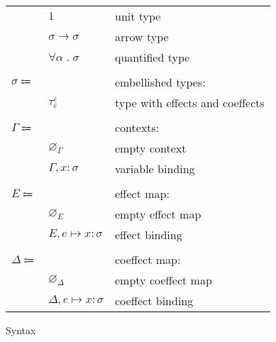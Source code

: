 \documentclass[12pt]{article}
\newcommand\anno[2]{#1 : #2}
\newcommand\evar{x}
\newcommand\proper{\tau}
\newcommand\embellished{\sigma}
\newcommand\tvar{\alpha}
\newcommand\tembellished[3]{{#1}^{#2}_{#3}}
\newcommand\tunit{1}
\newcommand\tarrow[2]{#1 \rightarrow #2}
\newcommand\tforall[2]{\forall #1 \; . \; #2}
\newcommand\context{\Gamma}
\newcommand\cempty{\varnothing_{\context}}
\newcommand\cextend[2]{#1, #2}
\newcommand\row{\varepsilon}
\newcommand\effect{e}
\newcommand\effectmap{E}
\newcommand\coeffectmap{\Delta}
\newcommand\emempty{\varnothing_{\effectmap}}
\newcommand\ecomempty{\varnothing_{\coeffectmap}}
\newcommand\emmap[2]{#1 \mapsto #2}
\newcommand\emextend[2]{#1, #2}
\begin{document}
\begin{figure}[H]
\begin{mdframed}[backgroundcolor=none]
\begin{center}
\begin{tabular}{l l l}
              & $\tunit$ & unit type \\
              & $\tarrow{\embellished}{\embellished}$ & arrow type \\
              & $\tforall{\tvar}{\embellished}$ & quantified type \\
              \\
              $\embellished \Coloneqq$ & & embellished types: \\
              & $\tembellished{\proper}{\row}{\row}$ & type with effects and coeffects \\
              \\
              $\context \Coloneqq$ & & contexts: \\
              & $\cempty$ & empty context \\
              & $\cextend{\context}{\anno{\evar}{\embellished}}$ & variable binding \\
              \\
              $\effectmap \Coloneqq$ & & effect map: \\
              & $\emempty$ & empty effect map \\
              & $\emextend{\effectmap}{\emmap{\effect}{\anno{\evar}{\embellished}}}$ & effect binding \\
              \\
              $\coeffectmap \Coloneqq$ & & coeffect map: \\
              & $\ecomempty$ & empty coeffect map \\
              & $\emextend{\coeffectmap}{\emmap{\effect}{\anno{\evar}{\embellished}}}$ & coeffect binding \\
            \end{tabular}
          \end{center}

          \caption{Syntax}\label{fig:syntax}
        \end{mdframed}
      \end{figure}
\end{document}

